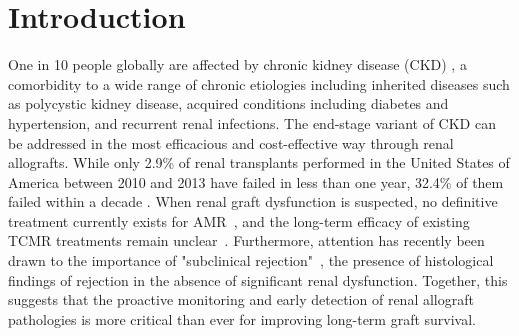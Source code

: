\section{Introduction}

One in 10 people globally are affected by chronic kidney disease (CKD) \cite{bikbov_Global_2020}, a comorbidity to a wide range of chronic etiologies including inherited diseases such as polycystic kidney disease, acquired conditions including diabetes and hypertension, and recurrent renal infections. The end-stage variant of CKD can be addressed in the most efficacious and cost-effective way through renal allografts. While only 2.9\% of renal transplants performed in the United States of America between 2010 and 2013 have failed in less than one year, 32.4\% of them failed within a decade \cite{poggio_Longterm_2021}. When renal graft dysfunction is suspected, no definitive treatment currently exists for AMR~\cite{bohmig_Antibodymediated_2025}, and the long-term efficacy of existing TCMR treatments remain unclear~\cite{ho_Effectiveness_2022, rampersad_negative_2022}. Furthermore, attention has recently been drawn to the importance of "subclinical rejection"~\cite{loupy_Subclinical_2015,mehta_Longterm_2022}, the presence of histological findings of rejection in the absence of significant renal dysfunction. Together, this suggests that the proactive monitoring and early detection of renal allograft pathologies is more critical than ever for improving long-term graft survival.

